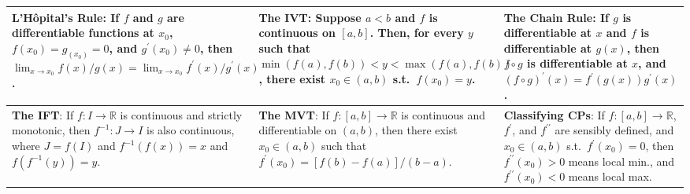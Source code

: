 


\newcommand{\modulename}{Calculus}

\DeclareMathOperator{\sgn}{sgn}



%
%

\centering
\begin{tabular}{|m{.31\linewidth}|m{.31\linewidth}|m{.31\linewidth}|}
\hline

\textbf{L'H{\^ o}pital's Rule}:
    If
        $ f $ and $ g $ are differentiable functions at $ x_0 $,
        $ f(x_0) = g_(x_0) = 0 $, and
        $ g^\prime(x_0) \neq 0 $,
    then
        $ \lim_{x \to x_0} f(x) / g(x) =
            \lim_{x \to x_0} f^\prime(x) / g^\prime(x) $. &

\textbf{The IVT}:
    Suppose $ a < b $ and $ f $ is continuous on $ [a, b] $. Then, for
    every $ y $ such that
        $ \min(f(a),f(b)) < y < \max(f(a),f(b))$,
    there exist $ x_0 \in (a, b) $ s.t.\ $ f(x_0) = y $. &

\textbf{The Chain Rule}:
    If
        $ g $ is differentiable at $ x $ and
        $ f $ is differentiable at $ g(x) $,
    then
        $ f \circ g $ is differentiable at $ x $, and
        $ (f \circ g)^\prime(x) = f^\prime(g(x)) g^\prime(x) $. \\

\hline

\textbf{The IFT}:
    If
        $ f \colon I \to \mathbb{R} $ is continuous and strictly monotonic,
    then
        $ f^{-1} \colon J \to I$ is also continuous, where
        $ J = f(I) $ and
        $ f^{-1}(f(x)) = x $ and
        $ f(f^{-1}(y)) = y $. &

\textbf{The MVT}:
    If
        $ f \colon [a, b] \to \mathbb{R}$ is continuous and differentiable on
            $ (a, b) $,
    then
        there exist $ x_0 \in (a, b)$ such that
        $ f^\prime(x_0) = \left[ f(b)-f(a) \right] / (b - a) $. &

\textbf{Classifying CPs}:
    If
        $ f \colon [a, b] \to \mathbb{R} $,
        $ f^\prime $, and
        $ f^{\prime\prime} $
        are sensibly defined, and $ x_0 \in (a, b) $ s.t.\ $f^\prime(x_0) = 0$,
    then
        $f^{\prime\prime}(x_0)>0$ means local min., and
        $f^{\prime\prime}(x_0)<0$ means local max. \\

\hline


\end{tabular}
